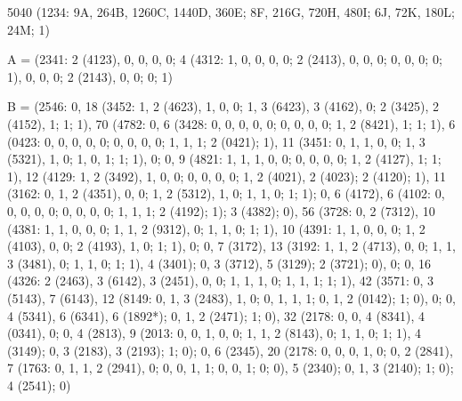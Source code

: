 { \scriptsize
5040 (1234: 9A, 264B, 1260C, 1440D, 360E; 8F, 216G, 720H, 480I; 6J, 72K, 180L; 24M; 1)

A = (2341: 2 (4123), 0, 0, 0, 0; 4 (4312: 1, 0, 0, 0, 0; 2 (2413), 0, 0, 0; 0, 0, 0; 0; 1), 0, 0, 0; 2 (2143), 0, 0; 0; 1)

B = (2546: 0, 18 (3452: 1, 2 (4623), 1, 0, 0; 1, 3 (6423), 3 (4162), 0; 2 (3425), 2 (4152), 1; 1; 1), 70 (4782: 0, 6 (3428: 0, 0, 0, 0, 0; 0, 0, 0, 0; 1, 2 (8421), 1; 1; 1), 6 (0423: 0, 0, 0, 0, 0; 0, 0, 0, 0; 1, 1, 1; 2 (0421); 1), 11 (3451: 0, 1, 1, 0, 0; 1, 3 (5321), 1, 0; 1, 0, 1; 1; 1), 0; 0, 9 (4821: 1, 1, 1, 0, 0; 0, 0, 0, 0; 1, 2 (4127), 1; 1; 1), 12 (4129: 1, 2 (3492), 1, 0, 0; 0, 0, 0, 0; 1, 2 (4021), 2 (4023); 2 (4120); 1), 11 (3162: 0, 1, 2 (4351), 0, 0; 1, 2 (5312), 1, 0; 1, 1, 0; 1; 1); 0, 6 (4172), 6 (4102: 0, 0, 0, 0, 0; 0, 0, 0, 0; 1, 1, 1; 2 (4192); 1); 3 (4382); 0), 56 (3728: 0, 2 (7312), 10 (4381: 1, 1, 0, 0, 0; 1, 1, 2 (9312), 0; 1, 1, 0; 1; 1), 10 (4391: 1, 1, 0, 0, 0; 1, 2 (4103), 0, 0; 2 (4193), 1, 0; 1; 1), 0; 0, 7 (3172), 13 (3192: 1, 1, 2 (4713), 0, 0; 1, 1, 3 (3481), 0; 1, 1, 0; 1; 1), 4 (3401); 0, 3 (3712), 5 (3129); 2 (3721); 0), 0; 0, 16 (4326: 2 (2463), 3 (6142), 3 (2451), 0, 0; 1, 1, 1, 0; 1, 1, 1; 1; 1), 42 (3571: 0, 3 (5143), 7 (6143), 12 (8149: 0, 1, 3 (2483), 1, 0; 0, 1, 1, 1; 0, 1, 2 (0142); 1; 0), 0; 0, 4 (5341), 6 (6341), 6 (1892*); 0, 1, 2 (2471); 1; 0), 32 (2178: 0, 0, 4 (8341), 4 (0341), 0; 0, 4 (2813), 9 (2013: 0, 0, 1, 0, 0; 1, 1, 2 (8143), 0; 1, 1, 0; 1; 1), 4 (3149); 0, 3 (2183), 3 (2193); 1; 0); 0, 6 (2345), 20 (2178: 0, 0, 0, 1, 0; 0, 2 (2841), 7 (1763: 0, 1, 1, 2 (2941), 0; 0, 0, 1, 1; 0, 0, 1; 0; 0), 5 (2340); 0, 1, 3 (2140); 1; 0); 4 (2541); 0)

}
